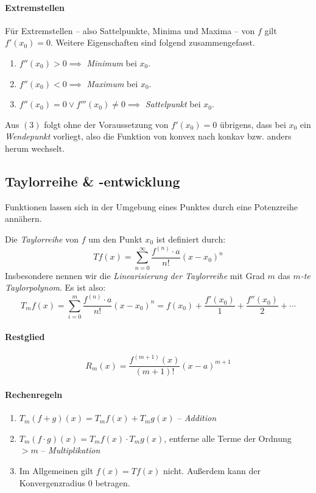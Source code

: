 \documentclass[a4paper, 9pt, DIV=24]{scrartcl}
\begin{document}
\paragraph{Extremstellen}
Für Extremstellen -- also Sattelpunkte, Minima und Maxima -- von $f$ gilt $f'(x_0) = 0$.
Weitere Eigenschaften sind folgend zusammengefasst.
\begin{enumerate}[label={(}\arabic*{)}]
 \item $f''(x_0) > 0 \implies$ \emph{Minimum} bei $x_0$.
 \item $f''(x_0) < 0 \implies$ \emph{Maximum} bei $x_0$.
 \item $f''(x_0) = 0 \vee f'''(x_0) \neq 0 \implies$ \emph{Sattelpunkt} bei $x_0$.
\end{enumerate}

Aus $(3)$ folgt ohne der Voraussetzung von $f'(x_0) = 0$ übrigens, dass bei $x_0$ ein \emph{Wendepunkt} vorliegt,
also die Funktion von konvex nach konkav bzw. anders herum wechselt.

\subsection{Taylorreihe \& -entwicklung}
Funktionen lassen sich in der Umgebung eines Punktes durch eine Potenzreihe annähern.

Die \emph{Taylorreihe} von $f$ um den Punkt $x_0$ ist definiert durch:
\[ T f(x) = \sum_{n=0}^{\infty} \dfrac{f^{(n)}\cdot a}{n!}(x-x_0)^n \]
Insbesondere nennen wir die \emph{Linearisierung der Taylorreihe} mit Grad $m$ das \emph{$m$-te Taylorpolynom}.
Es ist also:
\[ T_m f(x) = \sum_{i=0}^{m} \dfrac{f^{(n)}\cdot a}{n!}(x-x_0)^n = f(x_0) + \dfrac{f'(x_0)}{1} + \dfrac{f''(x_0)}{2} + \cdots\]

\paragraph{Restglied}

\[ R_{m}(x) = \frac{f^{(m+1)}(x)}{(m+1)!}(x-a)^{m+1} \]

\paragraph{Rechenregeln}
\begin{enumerate}[label={(}\arabic*{)}]
 \item $T_m(f+g)(x) = T_m f(x) + T_m g(x)$ -- \emph{Addition}
 \item $T_m(f\cdot g)(x) = T_m f(x) \cdot T_m g(x)$, entferne alle Terme der Ordnung $> m$ -- \emph{Multiplikation}
 \item Im Allgemeinen gilt $f(x) = T f(x)$ nicht. Außerdem kann der Konvergenzradius $0$ betragen.
\end{enumerate}
\end{document}
